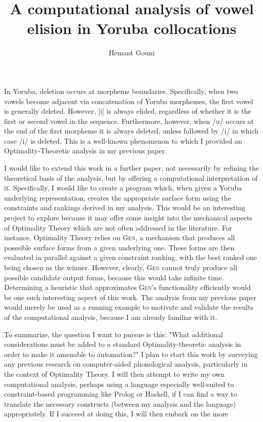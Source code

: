 \documentclass[12pt]{article}
\title{A computational analysis of vowel elision in Yoruba collocations}
\author{Hemant Gouni}
\begin{document}
\maketitle

In Yoruba, deletion occurs at morpheme boundaries. Specifically, when two
vowels become adjacent via concatenation of Yoruba morphemes, the first vowel
is generally deleted. However, [i] is always elided, regardless of whether it
is the first or second vowel in the sequence. Furthermore, however, when /u/
occurs at the end of the first morpheme it is always deleted, unless followed
by /i/ in which case /i/ is deleted. This is a well-known phenomenon to which
I provided an Optimality-Theoretic analysis in my previous paper.

I would like to extend this work in a further paper, not necessarily by
refining the theoretical basis of the analysis, but by offering a computational
interpretation of it. Specifically, I would like to create a program which,
when given a Yoruba underlying representation, creates the appropriate surface
form using the constraints and rankings derived in my analysis. This would be
an interesting project to explore because it may offer some insight into the
mechanical aspects of Optimality Theory which are not often addressed in the
literature. For instance, Optimality Theory relies on \textsc{Gen}, a mechanism
that produces all posssible surface forms from a given underlying one. These
forms are then evaluated in parallel against a given constraint ranking, with
the best ranked one being chosen as the winner. However, clearly, \textsc{Gen}
cannot truly produce all possible candidate output forms, because this would
take infinite time. Determining a heuristic that approximates \textsc{Gen}'s
functionality efficiently would be one such interesting aspect of this work.
The analysis from my previous paper would merely be used as a running example
to motivate and validate the results of the computational analysis, because I
am already familiar with it.

To summarize, the question I want to pursue is this: "What additional
considerations must be added to a standard Optimality-theoretic analysis in
order to make it amenable to automation?" I plan to start this work by
surveying any previous research on computer-aided phonological analysis,
particularly in the context of Optimality Theory. I will then attempt to write
my own computational analysis, perhaps using a language especially well-suited
to constraint-based programming like Prolog or Haskell, if I can find a way to
translate the necessary constructs (between my analysis and the language)
appropriately. If I succeed at doing this, I will then embark on the more
\end{document}
